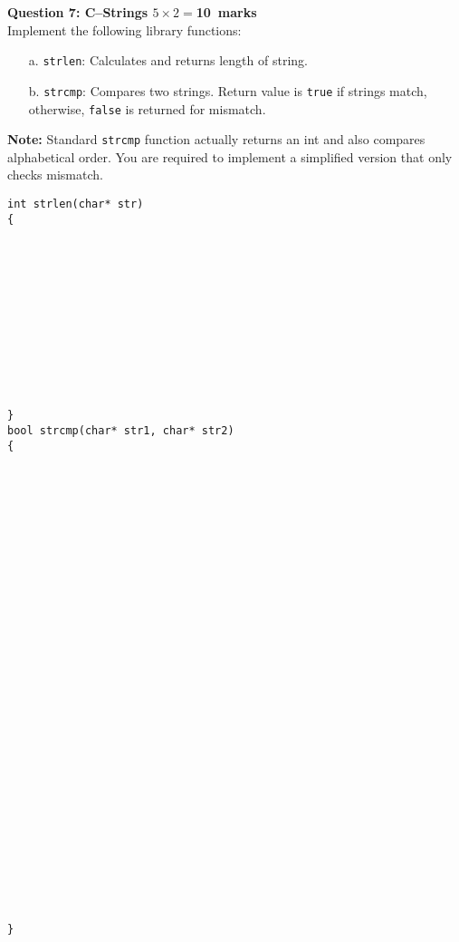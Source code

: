 \documentclass[12pt,a4paper]{article}
\def\Qseven{10}
\begin{document}
\noindent\textbf{Question 7: C--Strings \hfill $5\times 2=$\Qseven~marks}\\
Implement the following library functions:
\begin{itemize}
\item[a.] \verb|strlen|: Calculates and returns length of string.
\item[b.] \verb|strcmp|: Compares two strings. Return value is \verb|true| if strings match, otherwise, \verb|false| is returned for mismatch.
\end{itemize}
\noindent\textbf{Note:} Standard \verb|strcmp| function actually returns an int and also compares alphabetical order. You are required to implement a simplified version that only checks mismatch.
\begin{lstlisting}
int strlen(char* str)
{












}
bool strcmp(char* str1, char* str2)
{































}
\end{lstlisting}
\end{document}
